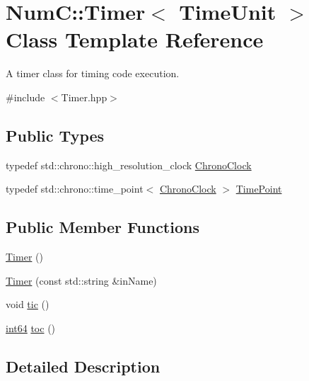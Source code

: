 \hypertarget{class_num_c_1_1_timer}{}\section{NumC\+:\+:Timer$<$ Time\+Unit $>$ Class Template Reference}
\label{class_num_c_1_1_timer}


A timer class for timing code execution.  




{\ttfamily \#include $<$Timer.\+hpp$>$}

\subsection*{Public Types}
\begin{DoxyCompactItemize}
\item 
typedef std\+::chrono\+::high\+\_\+resolution\+\_\+clock \mbox{\hyperlink{class_num_c_1_1_timer_ad7fe9141913b325f99723ccb0ca2e13f}{Chrono\+Clock}}
\item 
typedef std\+::chrono\+::time\+\_\+point$<$ \mbox{\hyperlink{class_num_c_1_1_timer_ad7fe9141913b325f99723ccb0ca2e13f}{Chrono\+Clock}} $>$ \mbox{\hyperlink{class_num_c_1_1_timer_a7a420ddcb94302d75becdfbdbb9a6b8b}{Time\+Point}}
\end{DoxyCompactItemize}
\subsection*{Public Member Functions}
\begin{DoxyCompactItemize}
\item 
\mbox{\hyperlink{class_num_c_1_1_timer_ab2d0eea21abbc5662104d5513d859378}{Timer}} ()
\item 
\mbox{\hyperlink{class_num_c_1_1_timer_a34cba7414c4331acbbd26fadff6eb5be}{Timer}} (const std\+::string \&in\+Name)
\item 
void \mbox{\hyperlink{class_num_c_1_1_timer_a3ed4a4706ea53f2144b112cb6f77447a}{tic}} ()
\item 
\mbox{\hyperlink{namespace_num_c_a96768695f3ea92cc3c4b79d37efb30c6}{int64}} \mbox{\hyperlink{class_num_c_1_1_timer_a0bbb8265474ec404013f6ce37cfdf71f}{toc}} ()
\end{DoxyCompactItemize}


\subsection{Detailed Description}
